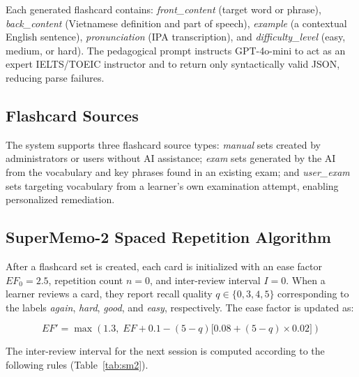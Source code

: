 \documentclass[conference]{IEEEtran}
\begin{document}
Each generated flashcard contains: \textit{front\_content} (target word or phrase), \textit{back\_content} (Vietnamese definition and part of speech), \textit{example} (a contextual English sentence), \textit{pronunciation} (IPA transcription), and \textit{difficulty\_level} (easy, medium, or hard). The pedagogical prompt instructs GPT-4o-mini to act as an expert IELTS/TOEIC instructor and to return only syntactically valid JSON, reducing parse failures.

\subsection{Flashcard Sources}
The system supports three flashcard source types: \textit{manual} sets created by administrators or users without AI assistance; \textit{exam} sets generated by the AI from the vocabulary and key phrases found in an existing exam; and \textit{user\_exam} sets targeting vocabulary from a learner's own examination attempt, enabling personalized remediation.

\subsection{SuperMemo-2 Spaced Repetition Algorithm}
After a flashcard set is created, each card is initialized with an ease factor $EF_0 = 2.5$, repetition count $n = 0$, and inter-review interval $I = 0$. When a learner reviews a card, they report recall quality $q \in \{0, 3, 4, 5\}$ corresponding to the labels \textit{again}, \textit{hard}, \textit{good}, and \textit{easy}, respectively. The ease factor is updated as:

\begin{equation}
EF' = \max\!\left(1.3,\; EF + 0.1 - (5-q)\bigl[0.08 + (5-q)\times 0.02\bigr]\right)
\label{eq:ef}
\end{equation}

The inter-review interval for the next session is computed according to the following rules (Table~\ref{tab:sm2}).
\end{document}
